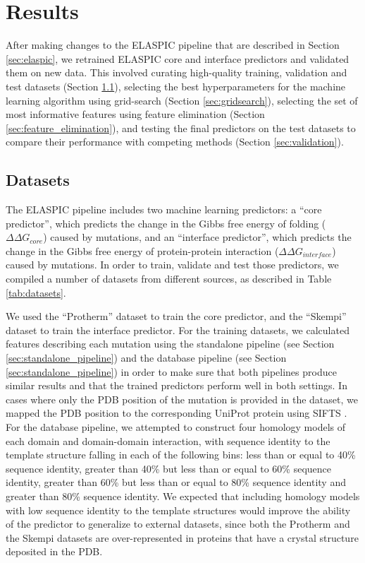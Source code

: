 
\chapter{Results} \label{ch:results}

After making changes to the ELASPIC pipeline that are described in Section \ref{sec:elaspic}, we retrained ELASPIC core and interface predictors and validated them on new data. This involved curating high-quality training, validation and test datasets (Section \ref{sec:datasets}), selecting the best hyperparameters for the machine learning algorithm using grid-search (Section \ref{sec:gridsearch}), selecting the set of most informative features using feature elimination (Section \ref{sec:feature_elimination}), and testing the final predictors on the test datasets to compare their performance with competing methods (Section \ref{sec:validation}).


\section{Datasets} \label{sec:datasets}

The ELASPIC pipeline includes two machine learning predictors: a ``core predictor'', which predicts the change in the Gibbs free energy of folding ($\Delta \Delta G_{core}$) caused by mutations, and an ``interface predictor'', which predicts the change in the Gibbs free energy of protein-protein interaction ($\Delta \Delta G_{interface}$) caused by mutations. In order to train, validate and test those predictors, we compiled a number of datasets from different sources, as described in Table \ref{tab:datasets}.

We used the ``Protherm'' dataset to train the core predictor, and the ``Skempi'' dataset to train the interface predictor. For the training datasets, we calculated features describing each mutation using the standalone pipeline (see Section \ref{sec:standalone_pipeline}) and the database pipeline (see Section \ref{sec:standalone_pipeline}) in order to make sure that both pipelines produce similar results and that the trained predictors perform well in both settings. In cases where only the PDB position of the mutation is provided in the dataset, we mapped the PDB position to the corresponding UniProt protein using SIFTS \cite{velankar_sifts:_2013}. For the database pipeline, we attempted to construct four homology models of each domain and domain-domain interaction, with sequence identity to the template structure falling in each of the following bins: less than or equal to 40\% sequence identity, greater than 40\% but less than or equal to 60\% sequence identity, greater than 60\% but less than or equal to 80\% sequence identity and greater than 80\% sequence identity. We expected that including homology models with low sequence identity to the template structures would improve the ability of the predictor to generalize to external datasets, since both the Protherm and the Skempi datasets are over-represented in proteins that have a crystal structure deposited in the PDB.


